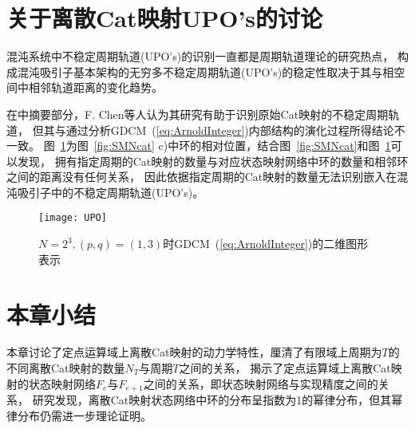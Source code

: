 \section{关于离散Cat映射UPO's的讨论}

混沌系统中不稳定周期轨道(UPO's)的识别一直都是周期轨道理论的研究热点，
构成混沌吸引子基本架构的无穷多不稳定周期轨道(UPO's)的稳定性取决于其与相空间中相邻轨道距离的变化趋势。
\iffalse
周期轨道理论认为，混沌动力学系统在相空间中生成的混沌吸引子包含了无穷多的不稳定周期轨道(UPO's)\upcite{Davidchack1999PRE}，
它们构成了混沌吸引子的骨架，其稳定性取决于其与相空间中相邻轨道的距离变化趋势。\fi
在中摘要部分，F. Chen等人认为其研究有助于识别原始Cat映射的不稳定周期轨道，
但其与通过分析GDCM~(\ref{eq:ArnoldInteger})内部结构的演化过程所得结论不一致。
图~\ref{fig:upo}为图~\ref{fig:SMNcat} c)中环的相对位置，结合图~\ref{fig:SMNcat}和图~\ref{fig:upo}可以发现，
拥有指定周期的Cat映射的数量与对应状态映射网络中环的数量和相邻环之间的距离没有任何关系，
因此依据指定周期的Cat映射的数量无法识别嵌入在混沌吸引子中的不稳定周期轨道(UPO's)。

\begin{figure}[!htb]
	\centering
	\begin{minipage}{1.25\BigOneImW}
		\centering
		\texttt{[image: UPO]}		
	\end{minipage}
\caption{$N={2^3}, (p, q)=(1, 3)$时GDCM~(\ref{eq:ArnoldInteger})的二维图形表示}
\label{fig:upo}
\end{figure}

\section{本章小结}

本章讨论了定点运算域上离散Cat映射的动力学特性，厘清了有限域上周期为$T$的不同离散Cat映射的数量$N_T$与周期$T$之间的关系，
揭示了定点运算域上离散Cat映射的状态映射网络$F_e$与$F_{e+1}$之间的关系，即状态映射网络与实现精度之间的关系，
研究发现，离散Cat映射状态网络中环的分布呈指数为1的幂律分布，但其幂律分布仍需进一步理论证明。
